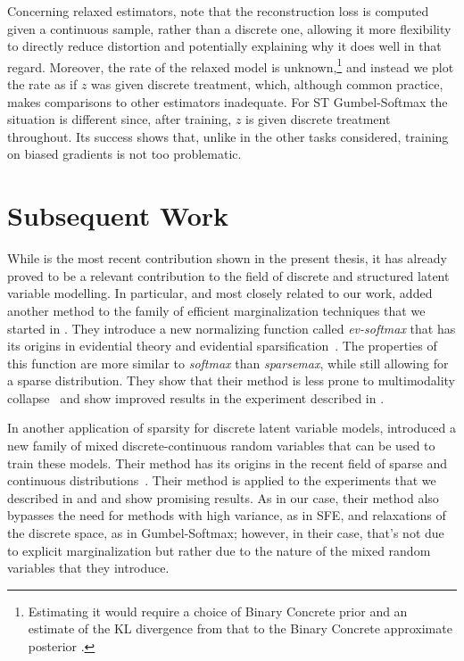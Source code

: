 Concerning relaxed estimators, note that the reconstruction loss is
computed given a continuous sample, rather than a discrete one,
allowing it more flexibility to directly reduce distortion and
potentially explaining why it does well in that regard. Moreover, the
rate of the relaxed model is unknown,\footnote{Estimating it would
    require a choice of Binary Concrete prior and an estimate of the KL
    divergence from that to the Binary Concrete approximate posterior
    \citep[Appendix C.3.2]{Concrete}.} and instead we plot the rate as if
$z$ was given discrete treatment, which, although common practice,
makes comparisons to other estimators inadequate. For ST
Gumbel-Softmax the situation is different since, after training, $z$
is given discrete treatment throughout. Its success shows that,
unlike in the other tasks considered, training on biased gradients is
not too problematic.

\section{Subsequent Work}
\label{sec:subsequent}

While \citet{correia2020procneurips} is the most recent contribution
shown in the present thesis, it has already proved to be a relevant
contribution to the field of discrete and structured latent variable
modelling. In particular, and most closely related to our work,
\citet{chen2021EvidentialSoftmaxSparse} added another method to the
family of efficient marginalization techniques that we started in
\citet{correia2020procneurips}. They introduce a new normalizing
function called \emph{ev-softmax} that has its origins in evidential
theory and evidential sparsification~\citep{itkina2020evidential}.
The properties of this function are more similar to \emph{softmax}
than \emph{sparsemax}, while still allowing for a sparse
distribution. They show that their method is less prone to
multimodality collapse~\citep{itkina2020evidential} and show improved
results in the experiment described in .

In another application of sparsity for discrete latent variable
models, \citet{farinhas2022SparseCommunicationMixed} introduced a new
family of mixed discrete-continuous random variables that can be used
to train these models. Their method has its origins in the recent
field of sparse and continuous
distributions~\citep{martins2020SparseContinuousAttention}. Their
method is applied to the experiments that we described in
 and  and show promising
results. As in our case, their method also bypasses the need for
methods with high variance, as in SFE, and relaxations of the
discrete space, as in Gumbel-Softmax; however, in their case, that's
not due to explicit marginalization but rather due to the nature of
the mixed random variables that they introduce.

